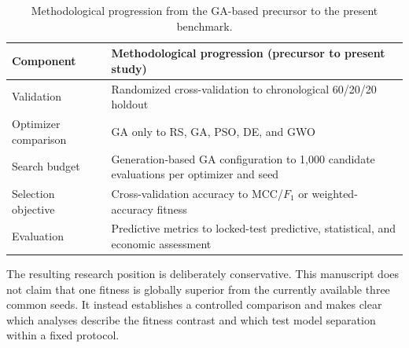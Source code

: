 \begin{table}[htbp]
\centering
\caption{Methodological progression from the GA-based precursor to the present benchmark.}
\label{tab:precursor_extension}
\manuscripttablestyle
\begin{tabularx}{\linewidth}{@{}L L@{}}
\toprule
Component & Methodological progression (precursor to present study) \\
\midrule
Validation & Randomized cross-validation to chronological 60/20/20 holdout \\
Optimizer comparison & GA only to RS, GA, PSO, DE, and GWO \\
Search budget & Generation-based GA configuration to 1,000 candidate evaluations per optimizer and seed \\
Selection objective & Cross-validation accuracy to MCC/$F_1$ or weighted-accuracy fitness \\
Evaluation & Predictive metrics to locked-test predictive, statistical, and economic assessment \\
\bottomrule
\end{tabularx}
\end{table}

The resulting research position is deliberately conservative. This manuscript does not claim that one fitness is globally superior from the currently available three common seeds. It instead establishes a controlled comparison and makes clear which analyses describe the fitness contrast and which test model separation within a fixed protocol.
